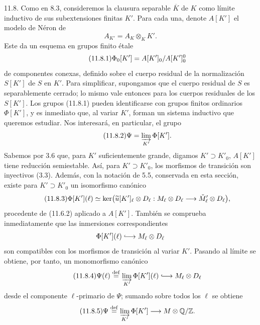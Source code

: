 
11.8. Como en 8.3, consideremos la clausura separable $\overline K$ de
$K$ como límite inductivo de sus subextensiones finitas $K'$. Para cada
una, denote $A[K']$ el modelo de Néron de
\begin{equation*}
 A_{K'}=A_K\otimes_K K'.
\end{equation*}
Este da un esquema en grupos finito étale
\begin{equation}\tag{11.8.1}
 \Phi_0[K']=\sisi{A[K']_0, A[K']_0^0}{A[K']_0/A[K']_0^0}
\end{equation}
de componentes conexas, definido sobre el cuerpo residual de la
normalización $S[K']$ de $S$ en $K'$. Para simplificar, supongamos que
el cuerpo residual de $S$ es separablemente cerrado; lo mismo vale
entonces para los cuerpos residuales de los $S[K']$. Los grupos (11.8.1)
pueden identificarse con grupos finitos ordinarios $\Phi[K']$, y es
inmediato que, al variar $K'$, forman un sistema inductivo que queremos
estudiar. Nos interesará, en particular, el grupo
\begin{equation}\tag{11.8.2}
 \Psi=\varinjlim_{K'}\Phi[K'].
\end{equation}
Sabemos por 3.6 que, para $K'$ suficientemente grande, digamos
$K'\supset K'_0$, $A[K']$ tiene reducción semiestable. Así, para
$K'\supset K'_0$, los morfismos de transición son inyectivos (3.3).
Además, con la notación de 5.5, conservada en esta sección, existe para
$K'\supset K'_0$ un isomorfismo canónico
\begin{equation}\tag{11.8.3}
 \sisi{\Psi[K'](\ell)}{\Phi[K'](\ell)}\simeq
 \ker\bigl(\widetilde u[K']_\ell\otimes D_\ell:
 M_\ell\otimes D_\ell\longrightarrow
 \check M'_\ell\otimes D_\ell\bigr),
\end{equation}
procedente de (11.6.2) aplicado a $A[K']$. También se comprueba
inmediatamente que las inmersiones correspondientes
\begin{equation*}
 \Phi[K'](\ell)\lhook\joinrel\longrightarrow M_\ell\otimes D_\ell
\end{equation*}
son compatibles con los morfismos de transición al variar $K'$.
Pasando al límite se obtiene, por tanto, un monomorfismo canónico
\begin{equation}\tag{11.8.4}
 \Psi(\ell)\mathrel{\mathop{=}^{\mathrm{def}}}
 \varinjlim_{K'}\Phi[K'](\ell)
 \lhook\joinrel\longrightarrow M_\ell\otimes D_\ell
\end{equation}
desde el componente $\ell$-primario de $\Psi$; sumando sobre todos los
$\ell$ se obtiene
\begin{equation}\tag{11.8.5}
 \Psi\mathrel{\mathop{=}^{\mathrm{def}}}
 \varinjlim_{K'}\Phi[K']
 \longrightarrow M\otimes\mathbb Q/\mathbb Z.
\end{equation}

